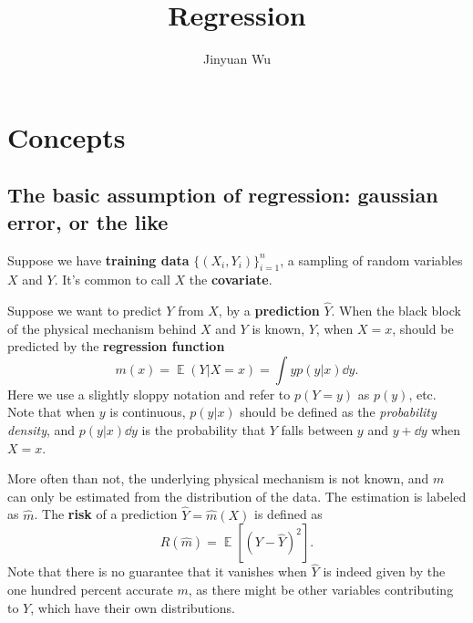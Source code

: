 \documentclass[hyperref, a4paper]{article}
\title{Regression}
\author{Jinyuan Wu}
\DeclareMathOperator{\expect}{\mathbb{E}}
\newcommand*{\concept}[1]{{\textbf{#1}}}
\begin{document}
\maketitle

\section{Concepts}

\subsection{The basic assumption of regression: gaussian error, or the like}

Suppose we have \concept{training data} $\{ (X_i, Y_i) \}_{i=1}^n$,
a sampling of random variables $X$ and $Y$.
It's common to call $X$ the \concept{covariate}.

Suppose we want to predict $Y$ from $X$,
by a \concept{prediction} $\hat{Y}$.
When the black block of the physical mechanism behind $X$ and $Y$ is known,
$Y$, when $X = x$, should be predicted by the \concept{regression function}
\begin{equation}
    m(x) = \expect (Y | X = x) = \int y p(y | x) \dd{y}.
\end{equation}
Here we use a slightly sloppy notation and refer to $p(Y = y)$ as $p(y)$, etc.
Note that when $y$ is continuous, $p(y | x)$ should be defined as the 
\emph{probability density}, and $p(y | x) \dd{y}$ is the probability
that $Y$ falls between $y$ and $y + \dd{y}$ when $X = x$.

More often than not, the underlying physical mechanism is not known,
and $m$ can only be estimated from the distribution of the data.
The estimation is labeled as $\hat{m}$.
The \concept{risk} of a prediction $\hat{Y} = \hat{m}(X)$ is defined as 
\begin{equation}
    R(\hat{m}) = \expect[(Y - \hat{Y})^2].
    \label{eq:risk-def}
\end{equation}
Note that there is no guarantee that it vanishes when $\hat{Y}$ is indeed given
by the one hundred percent accurate $m$,
as there might be other variables contributing to $Y$,
which have their own distributions.
\end{document}
